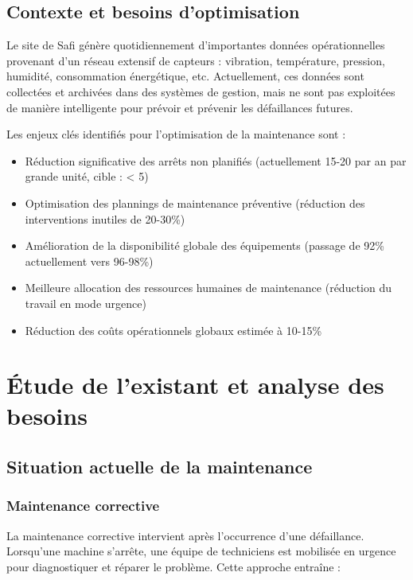\documentclass[a4paper,12pt,twoside]{report}
\begin{document}
\section{Contexte et besoins d'optimisation}

Le site de Safi génère quotidiennement d'importantes données opérationnelles provenant d'un réseau extensif de capteurs : vibration, température, pression, humidité, consommation énergétique, etc. Actuellement, ces données sont collectées et archivées dans des systèmes de gestion, mais ne sont pas exploitées de manière intelligente pour prévoir et prévenir les défaillances futures.

Les enjeux clés identifiés pour l'optimisation de la maintenance sont :
\begin{itemize}
    \item Réduction significative des arrêts non planifiés (actuellement 15-20 par an par grande unité, cible : < 5)
    \item Optimisation des plannings de maintenance préventive (réduction des interventions inutiles de 20-30\%)
    \item Amélioration de la disponibilité globale des équipements (passage de 92\% actuellement vers 96-98\%)
    \item Meilleure allocation des ressources humaines de maintenance (réduction du travail en mode urgence)
    \item Réduction des coûts opérationnels globaux estimée à 10-15\%
\end{itemize}

\chapter{Étude de l'existant et analyse des besoins}

\section{Situation actuelle de la maintenance}

\subsection{Maintenance corrective}

La maintenance corrective intervient après l'occurrence d'une défaillance. Lorsqu'une machine s'arrête, une équipe de techniciens est mobilisée en urgence pour diagnostiquer et réparer le problème. Cette approche entraîne :
\end{document}
